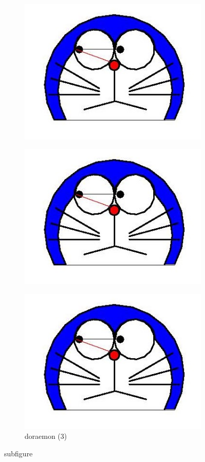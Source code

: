 \documentclass{article}
\begin{document}
\begin{figure}[htbp]
    \centering
	\begin{subfigure}{.3\textwidth}%
        \centering
        \includegraphics[scale=.1]{doraemon1.jpg}
	\end{subfigure}
	\begin{subfigure}{.3\textwidth}
        \centering
        \includegraphics[scale=.3]{doraemon1.jpg}
	\end{subfigure}
	\begin{subfigure}{.3\textwidth}
        \centering
        \includegraphics[scale=.5]{doraemon1.jpg}
        \caption{doraemon (3)} %
	\end{subfigure}	
    \caption{subfigure}	
\end{figure}
\end{document}
